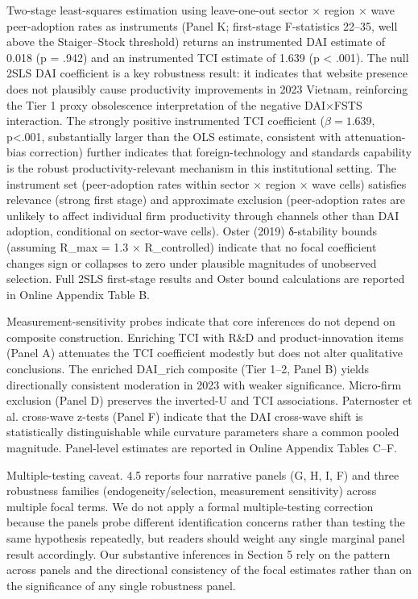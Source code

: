 \documentclass[12pt,a4paper]{article}
\begin{document}
Two-stage least-squares estimation using leave-one-out sector × region ×
wave peer-adoption rates as instruments (Panel K; first-stage
F-statistics 22--35, well above the Staiger--Stock threshold) returns an
instrumented DAI estimate of 0.018 (p = .942) and an instrumented TCI
estimate of 1.639 (p \textless{} .001). The null 2SLS DAI coefficient is
a key robustness result: it indicates that website presence does not
plausibly cause productivity improvements in 2023 Vietnam, reinforcing
the Tier 1 proxy obsolescence interpretation of the negative DAI×FSTS
interaction. The strongly positive instrumented TCI coefficient
(\(\beta=1.639\), p\textless.001, substantially larger than the OLS
estimate, consistent with attenuation-bias correction) further indicates
that foreign-technology and standards capability is the robust
productivity-relevant mechanism in this institutional setting. The
instrument set (peer-adoption rates within sector × region × wave cells)
satisfies relevance (strong first stage) and approximate exclusion
(peer-adoption rates are unlikely to affect individual firm productivity
through channels other than DAI adoption, conditional on sector-wave
cells). Oster (2019) δ-stability bounds (assuming R\_max = 1.3 ×
R\_controlled) indicate that no focal coefficient changes sign or
collapses to zero under plausible magnitudes of unobserved selection.
Full 2SLS first-stage results and Oster bound calculations are reported
in Online Appendix Table B.

Measurement-sensitivity probes indicate that core inferences do not
depend on composite construction. Enriching TCI with R\&D and
product-innovation items (Panel A) attenuates the TCI coefficient
modestly but does not alter qualitative conclusions. The enriched
DAI\_rich composite (Tier 1--2, Panel B) yields directionally consistent
moderation in 2023 with weaker significance. Micro-firm exclusion (Panel
D) preserves the inverted-U and TCI associations. Paternoster et al.
cross-wave z-tests (Panel F) indicate that the DAI cross-wave shift is
statistically distinguishable while curvature parameters share a common
pooled magnitude. Panel-level estimates are reported in Online Appendix
Tables C--F.

Multiple-testing caveat. 4.5 reports four narrative panels (G, H, I, F)
and three robustness families (endogeneity/selection, measurement
sensitivity) across multiple focal terms. We do not apply a formal
multiple-testing correction because the panels probe different
identification concerns rather than testing the same hypothesis
repeatedly, but readers should weight any single marginal panel result
accordingly. Our substantive inferences in Section 5 rely on the pattern
across panels and the directional consistency of the focal estimates
rather than on the significance of any single robustness panel.
\end{document}

